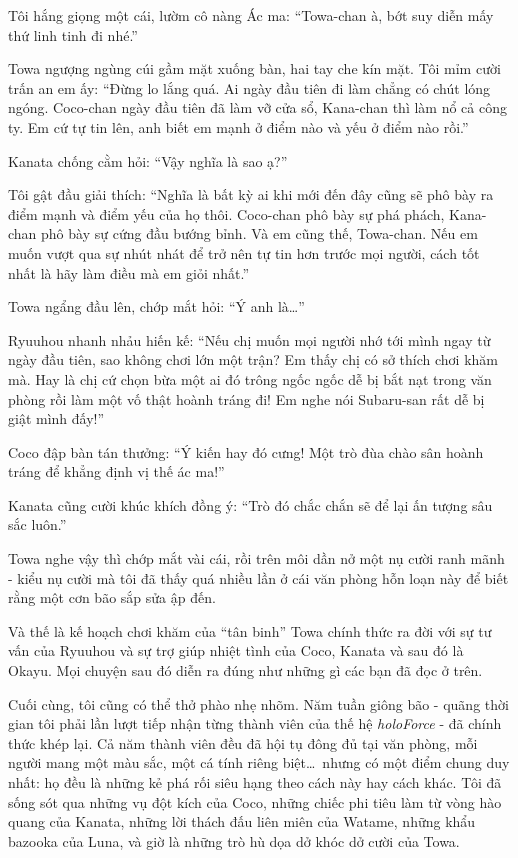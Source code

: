 \documentclass[../main.tex]{subfiles}
\begin{document}
Tôi hắng giọng một cái, lườm cô nàng Ác ma: ``Towa-chan à, bớt suy diễn mấy thứ linh tinh đi nhé.''

Towa ngượng ngùng cúi gầm mặt xuống bàn, hai tay che kín mặt. Tôi mỉm cười trấn an em ấy: ``Đừng lo lắng quá. Ai ngày đầu tiên đi làm chẳng có chút lóng ngóng. Coco-chan ngày đầu tiên đã làm vỡ cửa sổ, Kana-chan thì làm nổ cả công ty. Em cứ tự tin lên, anh biết em mạnh ở điểm nào và yếu ở điểm nào rồi.''

Kanata chống cằm hỏi: ``Vậy nghĩa là sao ạ?''

Tôi gật đầu giải thích: ``Nghĩa là bất kỳ ai khi mới đến đây cũng sẽ phô bày ra điểm mạnh và điểm yếu của họ thôi. Coco-chan phô bày sự phá phách, Kana-chan phô bày sự cứng đầu bướng bỉnh. Và em cũng thế, Towa-chan. Nếu em muốn vượt qua sự nhút nhát để trở nên tự tin hơn trước mọi người, cách tốt nhất là hãy làm điều mà em giỏi nhất.''

Towa ngẩng đầu lên, chớp mắt hỏi: ``Ý anh là\dots''

Ryuuhou nhanh nhảu hiến kế: ``Nếu chị muốn mọi người nhớ tới mình ngay từ ngày đầu tiên, sao không chơi lớn một trận? Em thấy chị có sở thích chơi khăm mà. Hay là chị cứ chọn bừa một ai đó trông ngốc ngốc dễ bị bắt nạt trong văn phòng rồi làm một vố thật hoành tráng đi! Em nghe nói Subaru-san rất dễ bị giật mình đấy!''

Coco đập bàn tán thưởng: ``Ý kiến hay đó cưng! Một trò đùa chào sân hoành tráng để khẳng định vị thế ác ma!''

Kanata cũng cười khúc khích đồng ý: ``Trò đó chắc chắn sẽ để lại ấn tượng sâu sắc luôn.''

Towa nghe vậy thì chớp mắt vài cái, rồi trên môi dần nở một nụ cười ranh mãnh - kiểu nụ cười mà tôi đã thấy quá nhiều lần ở cái văn phòng hỗn loạn này để biết rằng một cơn bão sắp sửa ập đến.

Và thế là kế hoạch chơi khăm của ``tân binh'' Towa chính thức ra đời với sự tư vấn của Ryuuhou và sự trợ giúp nhiệt tình của Coco, Kanata và sau đó là Okayu. Mọi chuyện sau đó diễn ra đúng như những gì các bạn đã đọc ở trên.

\il

Cuối cùng, tôi cũng có thể thở phào nhẹ nhõm. Năm tuần giông bão - quãng thời gian tôi phải lần lượt tiếp nhận từng thành viên của thế hệ \textit{holoForce} - đã chính thức khép lại. Cả năm thành viên đều đã hội tụ đông đủ tại văn phòng, mỗi người mang một màu sắc, một cá tính riêng biệt\dots\ nhưng có một điểm chung duy nhất: họ đều là những kẻ phá rối siêu hạng theo cách này hay cách khác. Tôi đã sống sót qua những vụ đột kích của Coco, những chiếc phi tiêu làm từ vòng hào quang của Kanata, những lời thách đấu liên miên của Watame, những khẩu bazooka của Luna, và giờ là những trò hù dọa dở khóc dở cười của Towa.
\end{document}
